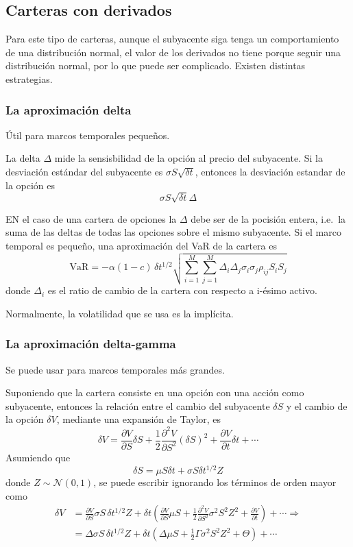 \subsection{Carteras con derivados}
Para este tipo de carteras, aunque el subyacente siga tenga un comportamiento de una distribución normal, el valor de los derivados no tiene porque seguir una distribución normal, por lo que puede ser complicado. Existen distintas estrategias.


\subsubsection{La aproximación delta}
Útil para marcos temporales pequeños.

La delta $\Delta$ mide la sensisbilidad de la opción al precio del subyacente. Si la desviación estándar del subyacente es $\sigma S \sqrt{\delta t}$, entonces la desviación estandar de la opción es
\[
    \sigma S \sqrt{\delta t} \Delta
\]

EN el caso de una cartera de opciones la $\Delta$ debe ser de la pocisión entera, i.e.\ la suma de las deltas de todas las opciones sobre el mismo subyacente. Si el marco temporal es pequeño, una aproximación del VaR de la cartera es
\[
    \boxed{\text{VaR} = -\alpha (1-c) \, \delta t^{1/2} \sqrt{ \sum_{i=1}^{M} \sum_{j=1}^{M} \Delta_i \Delta_j \sigma_i \sigma_j \rho_{ij} S_i S_j }}
\]
donde $\Delta_i$ es el ratio de cambio de la cartera con respecto a i-ésimo activo.

Normalmente, la volatilidad que se usa es la implícita.




\subsubsection{La aproximación delta-gamma}
Se puede usar para marcos temporales más grandes. 

Suponiendo que la cartera consiste en una opción con una acción como subyacente, entonces la relación entre el cambio del subyacente $\delta S$ y el cambio de la opción $\delta V$, mediante una expansión de Taylor, es
\[
\delta V = \frac{\partial V}{\partial S} \delta S + \frac{1}{2} \frac{\partial^2 V}{\partial S^2} (\delta S)^2 + \frac{\partial V}{\partial t} \delta t + \cdots
\]
Asumiendo que
\[
\delta S = \mu S \delta t + \sigma S \delta t^{1/2} Z
\]
donde $Z \sim \mathcal{N}(0,1)$, se puede escribir ignorando los términos de orden mayor como
\begin{align*}
    \delta V &= \frac{\partial V}{\partial S} \sigma S \, \delta t^{1/2} Z + \delta t \left( \frac{\partial V}{\partial S} \mu S + \frac{1}{2} \frac{\partial^2 V}{\partial S^2} \sigma^2 S^2 Z^2 + \frac{\partial V}{\partial t} \right) + \cdots \Rightarrow \\
     &= \boxed{\Delta \sigma S \, \delta t^{1/2} Z + \delta t \left( \Delta \mu S + \frac{1}{2} \Gamma \sigma^2 S^2 Z^2 + \Theta \right)} + \cdots
\end{align*}

